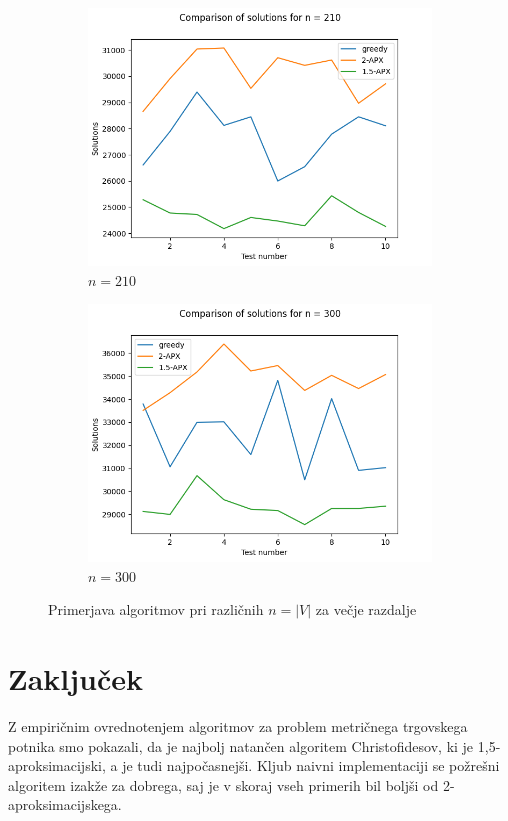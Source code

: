 \documentclass{article}
\begin{document}
\begin{figure}
\begin{subfigure}{0.5\textwidth}
		\includegraphics[width=\textwidth]{figs/results1000-3.png}
		\caption{$n = 210$}
		\label{fig:rezultat1000-3}
	\end{subfigure}
	\begin{subfigure}{0.5\textwidth}
		\centering
		\includegraphics[width=\textwidth]{figs/results1000-4.png}
		\caption{$n = 300$}
		\label{fig:rezultat1000-4}
	\end{subfigure}
	\caption{Primerjava algoritmov pri različnih $n = |V|$ za večje razdalje}
	\label{fig:rezultati1000}
\end{figure}


\section{Zaključek}

Z empiričnim ovrednotenjem algoritmov za problem metričnega trgovskega potnika
smo pokazali, da je najbolj natančen algoritem Christofidesov, ki je
1,5-aproksimacijski, a je tudi najpočasnejši. Kljub naivni implementaciji se
požrešni algoritem izakže za dobrega, saj je v skoraj vseh primerih bil boljši
od 2-aproksimacijskega.
\end{document}
